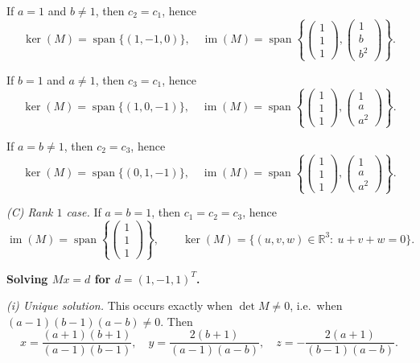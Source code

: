 \begin{solution}
	\par\noindent\textbullet\quad If \(a=1\) and \(b\neq 1\), then \(c_2=c_1\), hence
	\[
	\ker(M)=\operatorname{span}\{(1,-1,0)\},\quad
	\operatorname{im}(M)=\operatorname{span}\left\{\begin{pmatrix}1\\1\\1\end{pmatrix},\begin{pmatrix}1\\b\\b^2\end{pmatrix}\right\}.
	\]
	\par\noindent\textbullet\quad If \(b=1\) and \(a\neq 1\), then \(c_3=c_1\), hence
	\[
	\ker(M)=\operatorname{span}\{(1,0,-1)\},\quad
	\operatorname{im}(M)=\operatorname{span}\left\{\begin{pmatrix}1\\1\\1\end{pmatrix},\begin{pmatrix}1\\a\\a^2\end{pmatrix}\right\}.
	\]
	\par\noindent\textbullet\quad If \(a=b\neq 1\), then \(c_2=c_3\), hence
	\[
	\ker(M)=\operatorname{span}\{(0,1,-1)\},\quad
	\operatorname{im}(M)=\operatorname{span}\left\{\begin{pmatrix}1\\1\\1\end{pmatrix},\begin{pmatrix}1\\a\\a^2\end{pmatrix}\right\}.
	\]

\emph{(C) Rank \(1\) case.}
If \(a=b=1\), then \(c_1=c_2=c_3\), hence
\[
\operatorname{im}(M)=\operatorname{span}\left\{\begin{pmatrix}1\\1\\1\end{pmatrix}\right\},\qquad
\ker(M)=\{(u,v,w)\in\mathbb R^3:\ u+v+w=0\}.
\]

\textbf{Solving \(Mx=d\) for \(d=(1,-1,1)^T\).}

\emph{(i) Unique solution.}
This occurs exactly when \(\det M\neq 0\), i.e.\ when \((a-1)(b-1)(a-b)\neq 0\).
Then
\[
x=\frac{(a+1)(b+1)}{(a-1)(b-1)},\quad
y=\frac{2(b+1)}{(a-1)(a-b)},\quad
z=-\frac{2(a+1)}{(b-1)(a-b)}.
\]


\end{solution}
